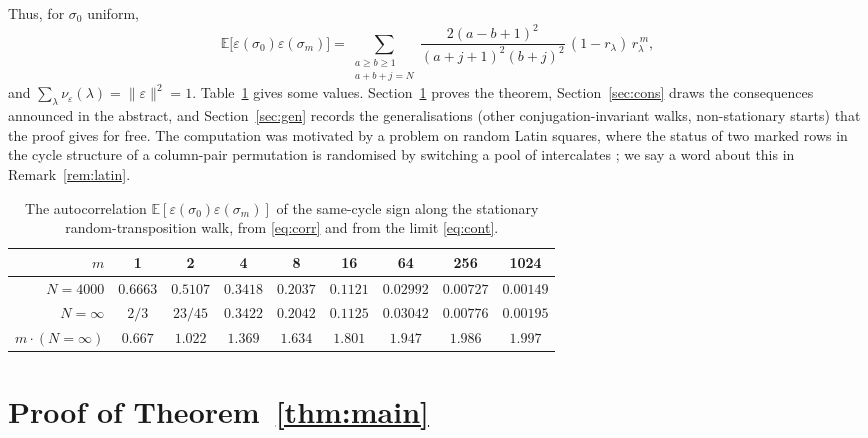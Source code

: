 \documentclass[11pt]{amsart}
\theoremstyle{remark}
\newcommand{\E}{\mathbb{E}}
\begin{document}
Thus, for $\sigma_0$ uniform,
\begin{equation}\label{eq:corr}
\E\bigl[\varepsilon(\sigma_0)\varepsilon(\sigma_m)\bigr]
=\sum_{\substack{a\ge b\ge1\\ a+b+j=N}}\frac{2(a-b+1)^2}{(a+j+1)^2(b+j)^2}\,(1-r_\lambda)\,r_\lambda^{\,m},
\end{equation}
and $\sum_\lambda\nu_\varepsilon(\lambda)=\|\varepsilon\|^2=1$.  Table~\ref{tab:values} gives some values.  Section~\ref{sec:proof} proves the theorem, Section~\ref{sec:cons} draws the consequences announced in the abstract, and Section~\ref{sec:gen} records the generalisations (other conjugation-invariant walks, non-stationary starts) that the proof gives for free.  The computation was motivated by a problem on random Latin squares, where the status of two marked rows in the cycle structure of a column-pair permutation is randomised by switching a pool of intercalates \cite{KPS25}; we say a word about this in Remark~\ref{rem:latin}.

\begin{table}[h]
\centering
\begin{tabular}{r@{\quad}cccccccc}
\toprule
$m$ & 1 & 2 & 4 & 8 & 16 & 64 & 256 & 1024\\
\midrule
$N=4000$ & $0.6663$ & $0.5107$ & $0.3418$ & $0.2037$ & $0.1121$ & $0.02992$ & $0.00727$ & $0.00149$\\
$N=\infty$ & $2/3$ & $23/45$ & $0.3422$ & $0.2042$ & $0.1125$ & $0.03042$ & $0.00776$ & $0.00195$\\
$m\cdot(N=\infty)$ & $0.667$ & $1.022$ & $1.369$ & $1.634$ & $1.801$ & $1.947$ & $1.986$ & $1.997$\\
\bottomrule
\end{tabular}
\medskip
\caption{The autocorrelation $\E[\varepsilon(\sigma_0)\varepsilon(\sigma_m)]$ of the same-cycle sign along the stationary random-transposition walk, from \eqref{eq:corr} and from the limit \eqref{eq:cont}.}
\label{tab:values}
\end{table}

\section{Proof of Theorem~\ref{thm:main}}\label{sec:proof}
\end{document}
